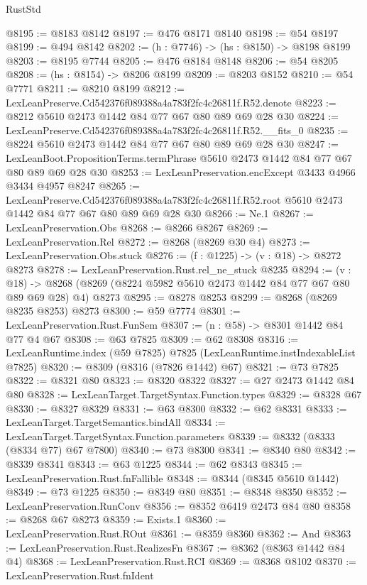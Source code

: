 \begin{lexlean}{RustStd}
\begin{coremodule}
@8195 := @8183 @8142
@8197 := @476 @8171 @8140
@8198 := @54 @8197
@8199 := @494 @8142
@8202 := (h : @7746) -> (hs : @8150) -> @8198 @8199
@8203 := @8195 @7744
@8205 := @476 @8184 @8148
@8206 := @54 @8205
@8208 := (hs : @8154) -> @8206 @8199
@8209 := @8203 @8152
@8210 := @54 @7771
@8211 := @8210 @8199
@8212 := LexLeanPreserve.Cd542376f089388a4a783f2fc4c26811f.R52.denote
@8223 := @8212 @5610 @2473 @1442 @84 @77 @67 @80 @89 @69 @28 @30
@8224 := LexLeanPreserve.Cd542376f089388a4a783f2fc4c26811f.R52.__fits_0
@8235 := @8224 @5610 @2473 @1442 @84 @77 @67 @80 @89 @69 @28 @30
@8247 := LexLeanBoot.PropositionTerms.termPhrase @5610 @2473 @1442 @84 @77 @67 @80 @89 @69 @28 @30
@8253 := LexLeanPreservation.encExcept @3433 @4966 @3434 @4957 @8247
@8265 := LexLeanPreserve.Cd542376f089388a4a783f2fc4c26811f.R52.root
    @5610
    @2473
    @1442
    @84
    @77
    @67
    @80
    @89
    @69
    @28
    @30
@8266 := Ne.{1}
@8267 := LexLeanPreservation.Obs
@8268 := @8266 @8267
@8269 := LexLeanPreservation.Rel
@8272 := @8268 (@8269 @30 @4)
@8273 := LexLeanPreservation.Obs.stuck
@8276 := (f : @1225) -> (v : @18) -> @8272 @8273
@8278 := LexLeanPreservation.Rust.rel_ne_stuck @8235
@8294 := (v : @18) ->
  @8268 (@8269 (@8224 @5982 @5610 @2473 @1442 @84 @77 @67 @80 @89 @69 @28) @4) @8273
@8295 := @8278 @8253
@8299 := @8268 (@8269 @8235 @8253) @8273
@8300 := @59 @7774
@8301 := LexLeanPreservation.Rust.FunSem
@8307 := (n : @58) -> @8301 @1442 @84 @77 @4 @67
@8308 := @63 @7825
@8309 := @62 @8308
@8316 := LexLeanRuntime.index (@59 @7825) @7825 (LexLeanRuntime.instIndexableList @7825)
@8320 := @8309 (@8316 (@7826 @1442) @67)
@8321 := @73 @7825
@8322 := @8321 @80
@8323 := @8320 @8322
@8327 := @27 @2473 @1442 @84 @80
@8328 := LexLeanTarget.TargetSyntax.Function.types
@8329 := @8328 @67
@8330 := @8327 @8329
@8331 := @63 @8300
@8332 := @62 @8331
@8333 := LexLeanTarget.TargetSemantics.bindAll
@8334 := LexLeanTarget.TargetSyntax.Function.parameters
@8339 := @8332 (@8333 (@8334 @77) @67 @7800)
@8340 := @73 @8300
@8341 := @8340 @80
@8342 := @8339 @8341
@8343 := @63 @1225
@8344 := @62 @8343
@8345 := LexLeanPreservation.Rust.fnFallible
@8348 := @8344 (@8345 @5610 @1442)
@8349 := @73 @1225
@8350 := @8349 @80
@8351 := @8348 @8350
@8352 := LexLeanPreservation.RunConv
@8356 := @8352 @6419 @2473 @84 @80
@8358 := @8268 @67 @8273
@8359 := Exists.{1}
@8360 := LexLeanPreservation.Rust.ROut
@8361 := @8359 @8360
@8362 := And
@8363 := LexLeanPreservation.Rust.RealizesFn
@8367 := @8362 (@8363 @1442 @84 @4)
@8368 := LexLeanPreservation.Rust.RCI
@8369 := @8368 @8102
@8370 := LexLeanPreservation.Rust.fnIdent

\end{coremodule}
\end{lexlean}
